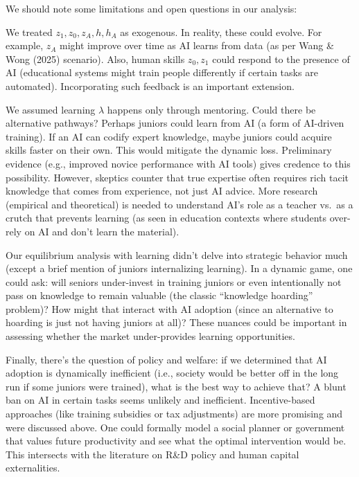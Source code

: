 \documentclass[12pt]{article}
\begin{document}
{We should note some {limitations and open questions} in our
analysis:


We treated \(z_1, z_0, z_A, h, h_A\) as exogenous. In reality, these
could evolve. For example, \(z_A\) might improve over time as AI
learns from data (as per Wang \& Wong (2025) scenario). Also, human
skills \(z_0, z_1\) could respond to the presence of AI (educational
systems might train people differently if certain tasks are
automated). Incorporating such feedback is an important extension.

We assumed learning \(\lambda\) happens only through mentoring. Could
there be alternative pathways? Perhaps juniors could learn from AI (a
form of AI-driven training). If an AI can codify expert knowledge,
maybe juniors could acquire skills faster on their own. This would
mitigate the dynamic loss. Preliminary evidence (e.g., improved novice
performance with AI tools) gives credence to this possibility.
However, skeptics counter that true expertise often requires rich
tacit knowledge that comes from experience, not just AI advice. More
research (empirical and theoretical) is needed to understand AI's role
as a teacher vs.~as a crutch that {prevents} learning (as seen in
education contexts where students over-rely on AI and don't learn the
material).

Our equilibrium analysis with learning didn't delve into strategic
behavior much (except a brief mention of juniors internalizing
learning). In a dynamic game, one could ask: will seniors
{under-invest in training} juniors or even intentionally not pass
on knowledge to remain valuable (the classic ``knowledge hoarding''
problem)? How might that interact with AI adoption (since an
alternative to hoarding is just not having juniors at all)? These
nuances could be important in assessing whether the market
under-provides learning opportunities.

Finally, there's the question of {policy and welfare}: if we
determined that AI adoption is dynamically inefficient (i.e., society
would be better off in the long run if some juniors were trained),
what is the best way to achieve that? A blunt ban on AI in certain
tasks seems unlikely and inefficient. Incentive-based approaches (like
training subsidies or tax adjustments) are more promising and were
discussed above. One could formally model a social planner or
government that values future productivity and see what the optimal
intervention would be. This intersects with the literature on R\&D
policy and human capital externalities.

}
\end{document}
